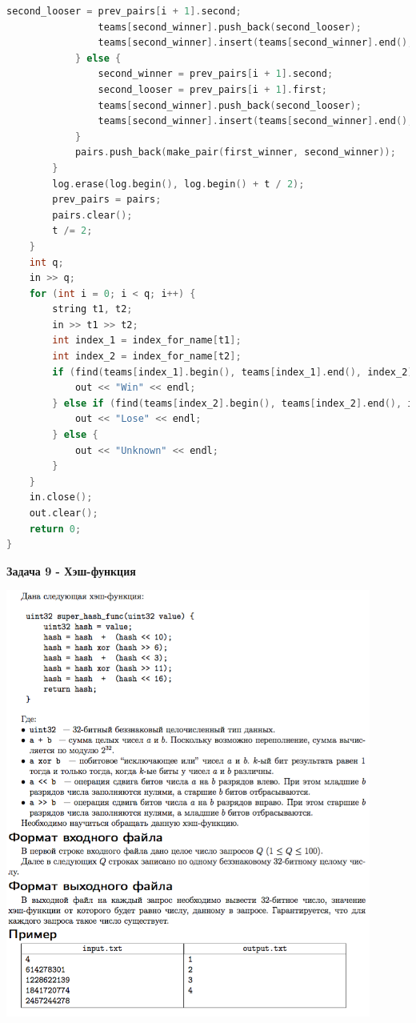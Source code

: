 \documentclass[a4paper,12pt]{article}
\begin{document}
\begin{lstlisting}[language=C]
                second_looser = prev_pairs[i + 1].second;
                teams[second_winner].push_back(second_looser);
                teams[second_winner].insert(teams[second_winner].end(), teams[second_looser].begin(), teams[second_looser].end());
            } else {
                second_winner = prev_pairs[i + 1].second;
                second_looser = prev_pairs[i + 1].first;
                teams[second_winner].push_back(second_looser);
                teams[second_winner].insert(teams[second_winner].end(), teams[second_looser].begin(), teams[second_looser].end());
            }
            pairs.push_back(make_pair(first_winner, second_winner));
        }
        log.erase(log.begin(), log.begin() + t / 2);
        prev_pairs = pairs;
        pairs.clear();
        t /= 2;
    }
    int q;
    in >> q;
    for (int i = 0; i < q; i++) {
        string t1, t2;
        in >> t1 >> t2;
        int index_1 = index_for_name[t1];
        int index_2 = index_for_name[t2];
        if (find(teams[index_1].begin(), teams[index_1].end(), index_2) != teams[index_1].end()) {
            out << "Win" << endl;
        } else if (find(teams[index_2].begin(), teams[index_2].end(), index_1) != teams[index_2].end()) {
            out << "Lose" << endl;
        } else {
            out << "Unknown" << endl;
        }
    }
    in.close();
    out.clear();
    return 0;
}
\end{lstlisting}


\newpage
\textbf{{\large Задача 9 - Хэш-функция}}

\begin{center}
\includegraphics[width=0.9\textwidth]{OC_Eurasia/9.png}\\ [1cm]
\end{center}
\end{document}
